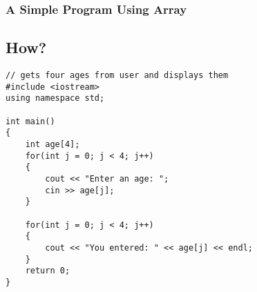 \documentclass{beamer}
\begin{document}
\begin{frame}[fragile]\frametitle{A Simple Program Using Array}
    \subsection{How?} %
    \label{sub:how_}
    \lstset{style=mystyle}
\begin{lstlisting}
// gets four ages from user and displays them
#include <iostream>
using namespace std;

int main()
{
    int age[4];
    for(int j = 0; j < 4; j++)
    {
        cout << "Enter an age: ";
        cin >> age[j];
    }

    for(int j = 0; j < 4; j++)
    {
        cout << "You entered: " << age[j] << endl;
    }
    return 0;
}
\end{lstlisting}
\end{frame}
\end{document}
